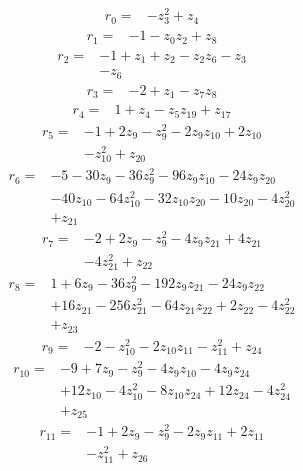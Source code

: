 \begingroup\small
\setlength{\jot}{2pt}
\setlength{\abovedisplayskip}{3pt}
\setlength{\belowdisplayskip}{3pt}
\begin{align*}
r_{0}={}&-z_{3}^{2} +z_{4}
\end{align*}
\begin{align*}
r_{1}={}&-1 -z_{0}z_{2} +z_{8}
\end{align*}
\begin{align*}
r_{2}={}&-1 +z_{1} +z_{2} -z_{2}z_{6} -z_{3}\\
&-z_{6}
\end{align*}
\begin{align*}
r_{3}={}&-2 +z_{1} -z_{7}z_{8}
\end{align*}
\begin{align*}
r_{4}={}&1 +z_{4} -z_{5}z_{19} +z_{17}
\end{align*}
\begin{align*}
r_{5}={}&-1 +2z_{9} -z_{9}^{2} -2z_{9}z_{10} +2z_{10}\\
&-z_{10}^{2} +z_{20}
\end{align*}
\begin{align*}
r_{6}={}&-5 -30z_{9} -36z_{9}^{2} -96z_{9}z_{10} -24z_{9}z_{20}\\
&-40z_{10} -64z_{10}^{2} -32z_{10}z_{20} -10z_{20} -4z_{20}^{2}\\
&+z_{21}
\end{align*}
\begin{align*}
r_{7}={}&-2 +2z_{9} -z_{9}^{2} -4z_{9}z_{21} +4z_{21}\\
&-4z_{21}^{2} +z_{22}
\end{align*}
\begin{align*}
r_{8}={}&1 +6z_{9} -36z_{9}^{2} -192z_{9}z_{21} -24z_{9}z_{22}\\
&+16z_{21} -256z_{21}^{2} -64z_{21}z_{22} +2z_{22} -4z_{22}^{2}\\
&+z_{23}
\end{align*}
\begin{align*}
r_{9}={}&-2 -z_{10}^{2} -2z_{10}z_{11} -z_{11}^{2} +z_{24}
\end{align*}
\begin{align*}
r_{10}={}&-9 +7z_{9} -z_{9}^{2} -4z_{9}z_{10} -4z_{9}z_{24}\\
&+12z_{10} -4z_{10}^{2} -8z_{10}z_{24} +12z_{24} -4z_{24}^{2}\\
&+z_{25}
\end{align*}
\begin{align*}
r_{11}={}&-1 +2z_{9} -z_{9}^{2} -2z_{9}z_{11} +2z_{11}\\
&-z_{11}^{2} +z_{26}
\end{align*}
